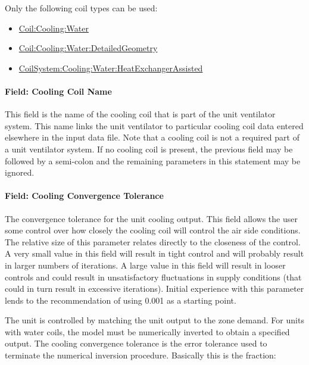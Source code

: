 Only the following coil types can be used:

\begin{itemize}
\item
  \hyperref[coilcoolingwater]{Coil:Cooling:Water}
\item
  \hyperref[coilcoolingwaterdetailedgeometry]{Coil:Cooling:Water:DetailedGeometry}
\item
  \hyperref[coilsystemcoolingwaterheatexchangerassisted]{CoilSystem:Cooling:Water:HeatExchangerAssisted}
\end{itemize}

\paragraph{Field: Cooling Coil Name}\label{field-cooling-coil-name-1-001}

This field is the name of the cooling coil that is part of the unit ventilator system. This name links the unit ventilator to particular cooling coil data entered elsewhere in the input data file. Note that a cooling coil is not a required part of a unit ventilator system. If no cooling coil is present, the previous field may be followed by a semi-colon and the remaining parameters in this statement may be ignored.

\paragraph{Field: Cooling Convergence Tolerance}\label{field-cooling-convergence-tolerance-1}

The convergence tolerance for the unit cooling output. This field allows the user some control over how closely the cooling coil will control the air side conditions. The relative size of this parameter relates directly to the closeness of the control. A very small value in this field will result in tight control and will probably result in larger numbers of iterations. A large value in this field will result in looser controls and could result in unsatisfactory fluctuations in supply conditions (that could in turn result in excessive iterations). Initial experience with this parameter lends to the recommendation of using 0.001 as a starting point.

The unit is controlled by matching the unit output to the zone demand. For units with water coils, the model must be numerically inverted to obtain a specified output. The cooling convergence tolerance is the error tolerance used to terminate the numerical inversion procedure. Basically this is the fraction:

